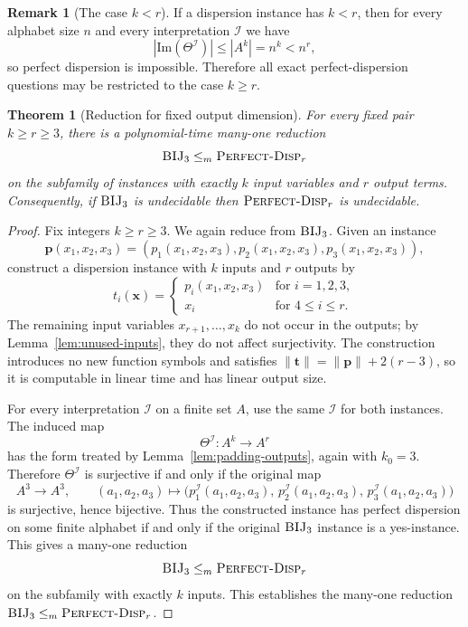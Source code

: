\documentclass[11pt]{article}
\newcommand{\instsize}[1]{\lVert #1\rVert}
\theoremstyle{definition}
\newtheorem{remark}{Remark}[section]
\theoremstyle{plain}
\newtheorem{theorem}[definition]{Theorem}
\newcommand{\Img}{\mathrm{Im}}
\begin{document}
\begin{remark}[The case $k<r$]
\label{rem:k-less-r}
If a dispersion instance has $k<r$, then for every alphabet size $n$ and every interpretation $\mathcal I$ we have
\[
|\Img(\Theta^\mathcal I)|\le |A^k|=n^k<n^r,
\]
so perfect dispersion is impossible.
Therefore all exact perfect-dispersion questions may be restricted to the case $k\ge r$.
\end{remark}

\begin{theorem}[Reduction for fixed output dimension]
\label{thm:reduction-nr}
For every fixed pair $k\ge r\ge 3$, there is a polynomial-time many-one reduction
\[
\textsc{BIJ}_3 \le_m \textsc{Perfect-Disp}_r
\]
on the subfamily of instances with exactly $k$ input variables and $r$ output terms.
Consequently, if $\textsc{BIJ}_3$ is undecidable then $\textsc{Perfect-Disp}_r$ is undecidable.
\end{theorem}

\begin{proof}
Fix integers $k\ge r\ge 3$.
We again reduce from $\textsc{BIJ}_3$.
Given an instance
\[
\mathbf p(x_1,x_2,x_3)=(p_1(x_1,x_2,x_3),p_2(x_1,x_2,x_3),p_3(x_1,x_2,x_3)),
\]
construct a dispersion instance with $k$ inputs and $r$ outputs by
\[
t_i(\mathbf x)=
\begin{cases}
p_i(x_1,x_2,x_3) & \text{for } i=1,2,3,\\
x_i & \text{for } 4\le i\le r.
\end{cases}
\]
The remaining input variables $x_{r+1},\dots,x_k$ do not occur in the outputs; by
Lemma~\ref{lem:unused-inputs}, they do not affect surjectivity.  The construction introduces no new function
symbols and satisfies
$\instsize{\mathbf t}=\instsize{\mathbf p}+2(r-3)$, so it is computable in linear time and has linear output
size.

For every interpretation $\mathcal I$ on a finite set $A$, use the same $\mathcal I$ for both instances.  The induced map
\[
\Theta^\mathcal I:A^k\to A^r
\]
has the form treated by Lemma~\ref{lem:padding-outputs}, again with $k_0=3$.
Therefore $\Theta^\mathcal I$ is surjective if and only if the original map
\[
A^3\to A^3,\qquad
(a_1,a_2,a_3)\mapsto
\bigl(
p_1^\mathcal I(a_1,a_2,a_3),\,
p_2^\mathcal I(a_1,a_2,a_3),\,
p_3^\mathcal I(a_1,a_2,a_3)
\bigr)
\]
is surjective, hence bijective.
Thus the constructed instance has perfect dispersion on some finite alphabet if and only if the original
$\textsc{BIJ}_3$ instance is a yes-instance.
This gives a many-one reduction
\[
\textsc{BIJ}_3 \le_m \textsc{Perfect-Disp}_r
\]
on the subfamily with exactly $k$ inputs.
This establishes the many-one reduction $\textsc{BIJ}_3 \le_m \textsc{Perfect-Disp}_r$.
\end{proof}
\end{document}
